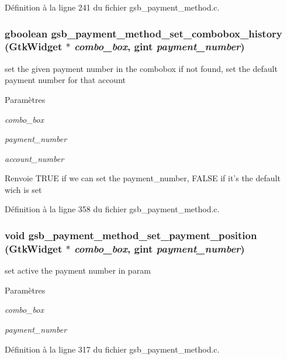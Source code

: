 Définition à la ligne 241 du fichier gsb\_\-payment\_\-method.c.

\subsubsection[{gsb\_\-payment\_\-method\_\-set\_\-combobox\_\-history}]{\setlength{\rightskip}{0pt plus 5cm}gboolean gsb\_\-payment\_\-method\_\-set\_\-combobox\_\-history (GtkWidget $\ast$ {\em combo\_\-box}, \/  gint {\em payment\_\-number})}\label{gsb__payment__method_8h_a90ac47cc6325eaee622f9357d3b65f68}
set the given payment number in the combobox if not found, set the default payment number for that account


\begin{DoxyParams}{Paramètres}
\item[{\em combo\_\-box}]\item[{\em payment\_\-number}]\item[{\em account\_\-number}]\end{DoxyParams}
\begin{DoxyReturn}{Renvoie}
TRUE if we can set the payment\_\-number, FALSE if it's the default wich is set 
\end{DoxyReturn}


Définition à la ligne 358 du fichier gsb\_\-payment\_\-method.c.

\subsubsection[{gsb\_\-payment\_\-method\_\-set\_\-payment\_\-position}]{\setlength{\rightskip}{0pt plus 5cm}void gsb\_\-payment\_\-method\_\-set\_\-payment\_\-position (GtkWidget $\ast$ {\em combo\_\-box}, \/  gint {\em payment\_\-number})}\label{gsb__payment__method_8h_ab12f5c754ced75c920803d84259a2128}
set active the payment number in param


\begin{DoxyParams}{Paramètres}
\item[{\em combo\_\-box}]\item[{\em payment\_\-number}]\end{DoxyParams}


Définition à la ligne 317 du fichier gsb\_\-payment\_\-method.c.

